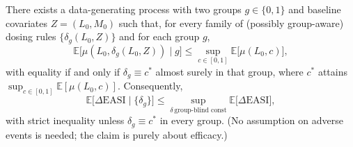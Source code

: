 ﻿\begin{theorem}\label{thm:constant-optimality}
There exists a data-generating process with two groups $g\in\{0,1\}$ and baseline covariates $Z=(L_0,M_0)$ such that, for every family of (possibly group-aware) dosing rules $\{\delta_g(L_0,Z)\}$ and for each group $g$,
\[
\mathbb E\big[\mu(L_0,\delta_g(L_0,Z))\mid g\big] \le \sup_{c\in[0,1]} \mathbb E\big[\mu(L_0,c)\big],
\]
with equality if and only if $\delta_g\equiv c^*$ almost surely in that group, where $c^*$ attains $\sup_{c\in[0,1]} \mathbb E[\mu(L_0,c)]$. Consequently,
\[
\mathbb E\big[\Delta\mathrm{EASI}\mid\{\delta_g\}\big] \le \sup_{\delta\,\text{group-blind const}} \mathbb E\big[\Delta\mathrm{EASI}\big],
\]
with strict inequality unless $\delta_g\equiv c^*$ in every group. (No assumption on adverse events is needed; the claim is purely about efficacy.)
\end{theorem}

